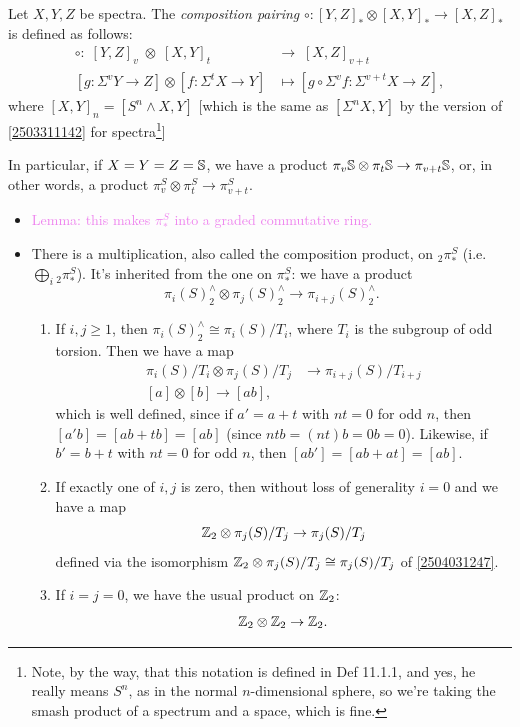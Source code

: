 \documentclass{MetricNotes2023}
\def\bb{\ensuremath\mathbb}
\def\inte{\ensuremath\mathbb{Z}}
\def\textcolour{\textcolor}
\begin{document}
\begin{definition}
Let \(X, Y, Z\) be spectra. The \textit{composition pairing} \(\circ : [Y, Z]_* \otimes [X,Y]_* \to [X,Z]_*\) is defined as follows: 
\begin{align*}
\circ :\; [Y, Z]_v\; \otimes \;[X,Y]_t\; &\to\; [X,Z]_{v+t}\\
[g : \Sigma^v Y \to Z]\otimes [f : \Sigma^t X\to Y] &\mapsto [g \circ \Sigma^v f : \Sigma^{v+t}X\to Z],
\end{align*}
where \([X,Y]_n=[S^n\wedge X, Y]\) [which is the same as \([\Sigma^n X, Y]\) by the version of \ref{2503311142} for spectra\footnote{Note, by the way, that this notation is defined in \autocite{rognes2} Def 11.1.1, and yes, he really means \(S^n\), as in the normal \(n\)-dimensional sphere, so we're taking the smash product of a spectrum and a space, which is fine.}]
\end{definition}

In particular, if \(X=Y=Z=\bb{S}\), we have a product \(\pi_v \bb{S}\otimes \pi_t \bb{S}\to \pi_{v+t}\bb{S}\), or, in other words, a product \(\pi_v^S\otimes \pi_t^S\to \pi_{v+t}^S\). 

\begin{itemize}
\item \textcolour{violet}{Lemma: this makes \(\pi_*^S\) into a graded commutative ring.}

\item There is a multiplication, also called the composition product, on \(\text{}_2\pi_*^S\) (i.e. \(\bigoplus_i \text{}_2\pi_*^S\)). It's inherited from the one on \(\pi_*^S\): we have a product
\[\pi_i(S)^\wedge_2 \otimes \pi_j(S)^\wedge_2 \to \pi_{i+j}(S)^\wedge_2.\]
\begin{enumerate}
\item If \(i, j \geq 1\), then \(\pi_i(S)^\wedge_2 \cong \pi_i(S)/T_i\), where \(T_i\) is the subgroup of odd torsion. Then we have a map
\begin{align*}
\pi_i(S)/T_i \otimes \pi_j(S)/T_j &\to \pi_{i+j}(S)/T_{i+j}\\
[a]\otimes[b] \to [ab],
\end{align*}
which is well defined, since if \(a'=a+t\) with \(nt=0\) for odd \(n\), then \([a'b]=[ab+tb]=[ab]\) (since \(ntb=(nt)b=0b=0\)). Likewise, if \(b'=b+t\) with \(nt=0\) for odd \(n\), then \([ab']=[ab+at]=[ab]\).
\item If exactly one of \(i, j\) is zero, then without loss of generality \(i=0\) and we have a map
\[\inte_2 \otimes \pi_j(S)/T_j \to \pi_{j}(S)/T_{j}\]
defined via the isomorphism \(\inte_2 \otimes \pi_j(S)/T_j \cong \pi_{j}(S)/T_{j}\) of \ref{2504031247}. 
\item If \(i=j=0\), we have the usual product on \(\inte_2\):
\[\inte_2 \otimes \inte_2 \to \inte_2.\]
\end{enumerate}
\end{itemize}
\end{document}
